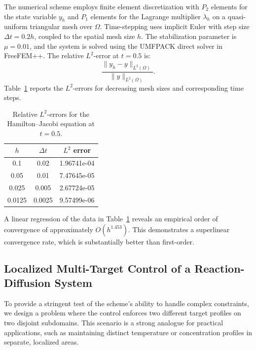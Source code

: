 \documentclass[pdflatex,sn-mathphys-num]{sn-jnl}%
\theoremstyle{thmstyleone}%
\numberwithin{equation}{section}
\begin{document}
The numerical scheme employs finite element discretization with $P_2$ elements for the state variable $y_h$ and $P_1$ elements for the Lagrange multiplier $\lambda_h$ on a quasi-uniform triangular mesh over $\Omega$. Time-stepping uses implicit Euler with step size $\Delta t = 0.2 h$, coupled to the spatial mesh size $h$. The stabilization parameter is $\mu = 0.01$, and the system is solved using the UMFPACK direct solver\cite{davis2004algorithm} in FreeFEM++\cite{hecht2012new}. The relative $L^2$-error at $t = 0.5$ is:
\[
\frac{\| y_h - y \|_{L^2(\Omega)}}{\| y \|_{L^2(\Omega)}}.
\]
Table~\ref{tab:numerical_results} reports the $L^2$-errors for decreasing mesh sizes and corresponding time steps.

\begin{table}[ht]
\centering
\caption{Relative $L^2$-errors for the Hamilton--Jacobi equation at $t = 0.5$.}
\label{tab:numerical_results}
\begin{tabular}{c c c}
\toprule
$h$ & $\Delta t$ & {$L^2$ error} \\
\midrule
0.1    & 0.02   & 1.96741e-04 \\
0.05   & 0.01   & 7.47645e-05 \\
0.025  & 0.005  & 2.67724e-05 \\
0.0125 & 0.0025 & 9.57499e-06 \\
\bottomrule
\end{tabular}
\end{table}

A linear regression of the data in Table~\ref{tab:numerical_results} reveals an empirical order of convergence of approximately $O(h^{1.453})$. This demonstrates a superlinear convergence rate, which is substantially better than first-order.

\subsection{Localized Multi-Target Control of a Reaction-Diffusion System}
\label{subsec:numerical_reaction_diffusion}

To provide a stringent test of the scheme's ability to handle complex constraints, we design a problem where the control enforces two different target profiles on two disjoint subdomains. This scenario is a strong analogue for practical applications, such as maintaining distinct temperature or concentration profiles in separate, localized areas.
\end{document}
